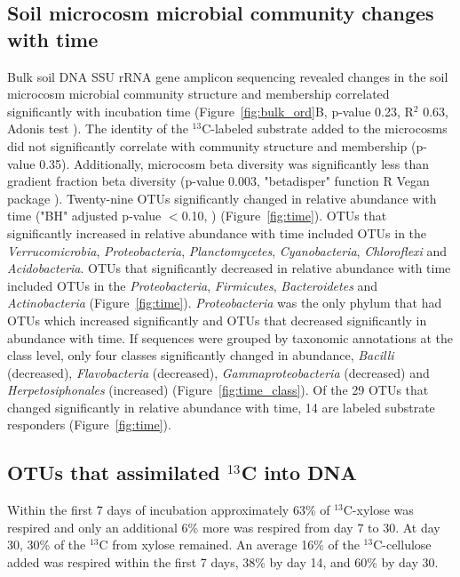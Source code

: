 \subsection{Soil microcosm microbial community changes with time}
Bulk soil DNA SSU rRNA gene amplicon sequencing revealed changes in the soil
microcosm microbial community structure and membership correlated significantly
with incubation time (Figure~\ref{fig:bulk_ord}B, p-value 0.23, R$^{2}$ 0.63,
Adonis test \citet{Anderson2001a}). The identity of the $^{13}$C-labeled
substrate added to the microcosms did not significantly correlate with
community structure and membership (p-value 0.35). Additionally, microcosm beta
diversity was significantly less than gradient fraction beta diversity (p-value
0.003, "betadisper" function R Vegan package
\citet{Anderson2006,oksanen2007vegan}). Twenty-nine OTUs significantly changed
in relative abundance with time ("BH" adjusted p-value $<$0.10,
\citet{YBenjamini1995}) (Figure~\ref{fig:time}). OTUs that significantly
increased in relative abundance with time included OTUs in the
\textit{Verrucomicrobia}, \textit{Proteobacteria}, \textit{Planctomycetes},
\textit{Cyanobacteria}, \textit{Chloroflexi} and \textit{Acidobacteria}. OTUs
that significantly decreased in relative abundance with time included OTUs in
the \textit{Proteobacteria}, \textit{Firmicutes}, \textit{Bacteroidetes} and
\textit{Actinobacteria} (Figure~\ref{fig:time}). \textit{Proteobacteria} was
the only phylum that had OTUs which increased significantly and OTUs that
decreased significantly in abundance with time. If sequences were grouped by
taxonomic annotations at the class level, only four classes significantly
changed in abundance, \textit{Bacilli} (decreased), \textit{Flavobacteria}
(decreased), \textit{Gammaproteobacteria} (decreased) and
\textit{Herpetosiphonales} (increased) (Figure~\ref{fig:time_class}). Of the
29 OTUs that changed significantly in relative abundance with time, 14 are
labeled substrate responders (Figure~\ref{fig:time}).

\subsection{OTUs that assimilated $^{13}$C into DNA}
Within the first 7 days of incubation approximately 63\% of $^{13}$C-xylose was
respired and only an additional 6\% more was respired from day 7 to 30. At day
30, 30\% of the $^{13}$C from xylose remained. An average 16\% of the
$^{13}$C-cellulose added was respired within the first 7 days, 38\% by day 14,
and 60\% by day 30.   

